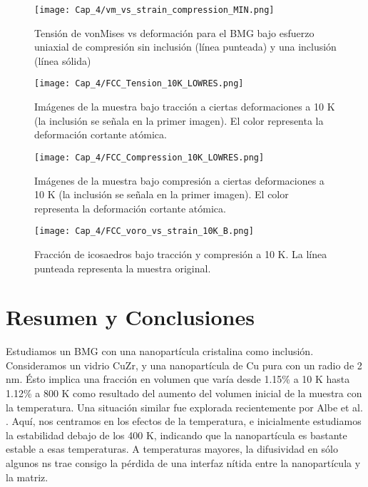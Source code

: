 \begin{figure}[h!]
\centering
\texttt{[image: Cap\_4/vm\_vs\_strain\_compression\_MIN.png]}
\caption[vonMises vs deformación (compresión)]{Tensión de vonMises vs deformación para el BMG bajo esfuerzo uniaxial de compresión sin inclusión (línea punteada) y una inclusión (línea sólida)}
\label{C4:fg:fcc_vm_compression}
\end{figure}

\begin{figure}[h!]
\centering
\texttt{[image: Cap\_4/FCC\_Tension\_10K\_LOWRES.png]}
\caption[Muestra bajo tracción a 10K]{Imágenes de la muestra bajo tracción a ciertas deformaciones a 10 K (la inclusión se señala en la primer imagen). El color representa la deformación cortante atómica.}
\label{C4:fg:fcc_tension_bmg_10K}
\end{figure}

\begin{figure}[h!]
\centering
\texttt{[image: Cap\_4/FCC\_Compression\_10K\_LOWRES.png]}
\caption[Muestra bajo compresión a 10K]{Imágenes de la muestra bajo compresión a ciertas deformaciones a 10 K (la inclusión se señala en la primer imagen). El color representa la deformación cortante atómica.}
\label{C4:fg:fcc_compression_bmg_10K}
\end{figure}

\clearpage

\begin{figure}[h!]
\centering
\texttt{[image: Cap\_4/FCC\_voro\_vs\_strain\_10K\_B.png]}
\caption[Fracción de icosaedros a 10K]{Fracción de icosaedros bajo tracción y compresión a 10 K. La línea punteada representa la muestra original.}
\label{C4:fg:fcc_voro_10K}
\end{figure}

\section{Resumen y Conclusiones}

Estudiamos un BMG con una nanopartícula cristalina como inclusión. Consideramos un vidrio CuZr, y una nanopartícula de Cu pura con un radio de 2 nm. Ésto implica una fracción en volumen que varía desde 1.15\% a 10 K hasta 1.12\% a 800 K como resultado del aumento del volumen inicial de la muestra con la temperatura. Una situación similar fue explorada recientemente por Albe et al. \cite{albe13}. Aquí, nos centramos en los efectos de la temperatura, e inicialmente estudiamos la estabilidad debajo de los 400 K, indicando que la nanopartícula es bastante estable a esas temperaturas. A temperaturas mayores, la difusividad en sólo algunos ns trae consigo la pérdida de una interfaz nítida entre la nanopartícula y la matriz.

